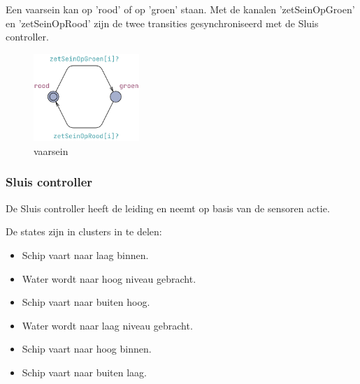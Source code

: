 \documentclass{article} %
\begin{document}
Een vaarsein kan op 'rood' of op 'groen' staan. Met de kanalen 'zetSeinOpGroen' en 'zetSeinOpRood' zijn de twee transities gesynchroniseerd met de Sluis controller.

\begin{figure}[h]
    \includegraphics[width=4cm]{vaarsein.png}
    \centering    
    \caption{vaarsein}
\end{figure}

\newpage

\subsubsection{Sluis controller}

De Sluis controller heeft de leiding en neemt op basis van de sensoren actie.

De states zijn in clusters in te delen:

\begin{itemize}
    \item Schip vaart naar laag binnen.
    \item Water wordt naar hoog niveau gebracht.
    \item Schip vaart naar buiten hoog.
    \item Water wordt naar laag niveau gebracht.
    \item Schip vaart naar hoog binnen.
    \item Schip vaart naar buiten laag.
\end{itemize}
\end{document}

